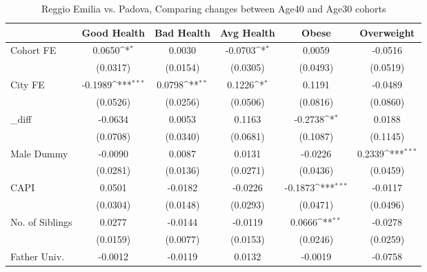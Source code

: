 \begin{table}[htbp]\centering
\def\sym#1{\ifmmode^{#1}\else\(^{#1}\)\fi}
\caption{Reggio Emilia vs. Padova, Comparing changes between Age40 and Age30 cohorts}
\begin{tabular}{l*{5}{c}}
\toprule
            &\multicolumn{1}{c}{Good Health}&\multicolumn{1}{c}{Bad Health}&\multicolumn{1}{c}{Avg Health}&\multicolumn{1}{c}{Obese}&\multicolumn{1}{c}{Overweight}\\
\midrule
Cohort FE   &      0.0650\sym{*}  &      0.0030         &     -0.0703\sym{*}  &      0.0059         &     -0.0516         \\
            &    (0.0317)         &    (0.0154)         &    (0.0305)         &    (0.0493)         &    (0.0519)         \\
\addlinespace
City FE     &     -0.1989\sym{***}&      0.0798\sym{**} &      0.1226\sym{*}  &      0.1191         &     -0.0489         \\
            &    (0.0526)         &    (0.0256)         &    (0.0506)         &    (0.0816)         &    (0.0860)         \\
\addlinespace
\_diff       &     -0.0634         &      0.0053         &      0.1163         &     -0.2738\sym{*}  &      0.0188         \\
            &    (0.0708)         &    (0.0340)         &    (0.0681)         &    (0.1087)         &    (0.1145)         \\
\addlinespace
Male Dummy  &     -0.0090         &      0.0087         &      0.0131         &     -0.0226         &      0.2339\sym{***}\\
            &    (0.0281)         &    (0.0136)         &    (0.0271)         &    (0.0436)         &    (0.0459)         \\
\addlinespace
CAPI        &      0.0501         &     -0.0182         &     -0.0226         &     -0.1873\sym{***}&     -0.0117         \\
            &    (0.0304)         &    (0.0148)         &    (0.0293)         &    (0.0471)         &    (0.0496)         \\
\addlinespace
No. of Siblings&      0.0277         &     -0.0144         &     -0.0119         &      0.0666\sym{**} &     -0.0278         \\
            &    (0.0159)         &    (0.0077)         &    (0.0153)         &    (0.0246)         &    (0.0259)         \\
\addlinespace
Father Univ.&     -0.0012         &     -0.0119         &      0.0132         &     -0.0019         &     -0.0758         \\

\end{tabular}
\end{table}
